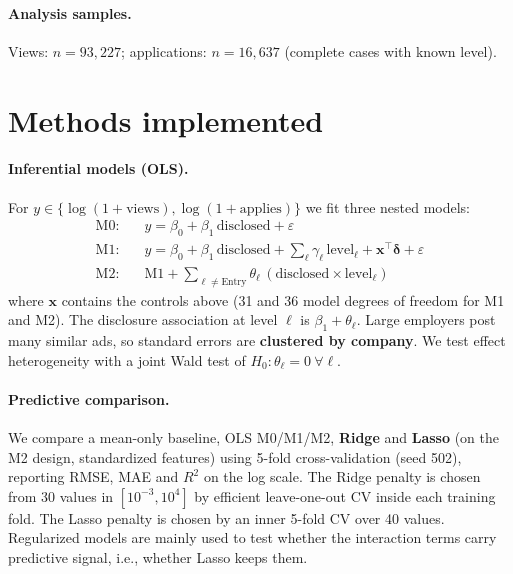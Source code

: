 \documentclass{article}
\begin{document}
\paragraph{Analysis samples.} Views: $n=93{,}227$; applications: $n=16{,}637$ (complete cases with known level).

\section{Methods implemented}
\label{sec:methods}

\paragraph{Inferential models (OLS).} For $y\in\{\log(1+\text{views}),\log(1+\text{applies})\}$ we fit three nested models:
\begin{align*}
\text{M0:}\quad & y = \beta_0 + \beta_1\,\text{disclosed} + \varepsilon\\
\text{M1:}\quad & y = \beta_0 + \beta_1\,\text{disclosed} + \textstyle\sum_\ell \gamma_\ell\,\text{level}_\ell + \mathbf{x}^\top\boldsymbol\delta + \varepsilon\\
\text{M2:}\quad & \text{M1} + \textstyle\sum_{\ell\neq\text{Entry}} \theta_\ell\,(\text{disclosed}\times\text{level}_\ell)
\end{align*}
where $\mathbf{x}$ contains the controls above (31 and 36 model degrees of freedom for M1 and M2). The disclosure association at level $\ell$ is $\beta_1+\theta_\ell$. Large employers post many similar ads, so standard errors are \textbf{clustered by company}. We test effect heterogeneity with a joint Wald test of $H_0:\theta_\ell=0\ \forall\ell$.

\paragraph{Predictive comparison.} We compare a mean-only baseline, OLS M0/M1/M2, \textbf{Ridge} and \textbf{Lasso} (on the M2 design, standardized features) using 5-fold cross-validation (seed 502), reporting RMSE, MAE and $R^2$ on the log scale. The Ridge penalty is chosen from 30 values in $[10^{-3},10^4]$ by efficient leave-one-out CV inside each training fold. The Lasso penalty is chosen by an inner 5-fold CV over 40 values. Regularized models are mainly used to test whether the interaction terms carry predictive signal, i.e., whether Lasso keeps them.
\end{document}
